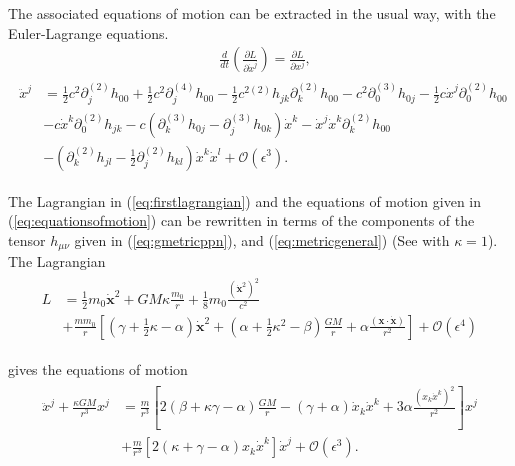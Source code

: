 The associated equations of motion can be extracted in the usual way, with the Euler-Lagrange equations.
\begin{align*}
	&\frac{d}{dt}\left(\frac{\partial L}{\partial \dot{x}^j}\right) = \frac{\partial L}{\partial x^j},
	\end{align*}
	\begin{align}
	\begin{split}
	\label{eq:equationsofmotion}
	\ddot{x}^j &= \frac{1}{2}c^2\partial_{j}^{(2)}h_{00}+\frac{1}{2}c^2\partial_{j}^{(4)}h_{00}-\frac{1}{2}c^{2(2)}h_{jk}\partial_{k}^{(2)}h_{00}-c^2 \partial_0^{(3)}h_{0j} -\frac{1}{2}c\dot{x}^j\partial_0^{(2)}h_{00} \\
	&-c\dot{x}^k\partial_0^{(2)}h_{jk}-c\left(\partial_k^{(3)}h_{0j}-\partial_j^{(3)}h_{0k}\right)\dot{x}^k
	-\dot{x}^j\dot{x}^k\partial_k^{(2)}h_{00} \\
	&- \left(\partial_k^{(2)}h_{jl}-\frac{1}{2}\partial_j^{(2)}h_{kl}\right)\dot{x}^k\dot{x}^l + \mathcal{O}(\epsilon^3).
	\end{split}
	\end{align}


The Lagrangian in (\ref{eq:firstlagrangian}) and the equations of motion given in (\ref{eq:equationsofmotion}) can be rewritten in terms of the components of the tensor $h_{\mu\nu}$ given in (\ref{eq:gmetricppn}), and (\ref{eq:metricgeneral}) (See \cite{Brumberg} with $\kappa = 1$).\\

The Lagrangian
\begin{align}
\begin{split}
L &= \frac{1}{2} m_0 \dot{\mathbf{x}}^2 +  GM \kappa \frac{m_0}{r}+ \frac{1}{8} m_0 \frac{(\dot{\mathbf{x}}^{2})^2}{c^2}  \\
&+ \frac{m m_0}{r}\left[\left(\gamma + \frac{1}{2}\kappa-\alpha \right) \dot{\mathbf{x}}^2+\left(\alpha + \frac{1}{2}\kappa^2-\beta \right)\frac{GM}{r}+\alpha \frac{\left(\mathbf{x}\cdot\mathbf{\dot{x}}\right)}{r^2}\right]+\mathcal{O}(\epsilon^4)
\end{split}
\end{align}

gives the equations of motion
\begin{align*}
\begin{split}
\ddot{x}^j + \frac{\kappa GM}{r^3}x^j &= \frac{m}{r^3}\left[2(\beta + \kappa \gamma - \alpha)\frac{GM}{r}-(\gamma+\alpha)\dot{x}_k\dot{x}^k+ 3\alpha\frac{\left(x_k\dot{x}^k\right)^2}{r^2}\right]x^j\\
&+\frac{m}{r^3}\left[2(\kappa+\gamma - \alpha)x_k\dot{x}^k\right]\dot{x}^j+\mathcal{O}(\epsilon^3).
\end{split}
\end{align*}

